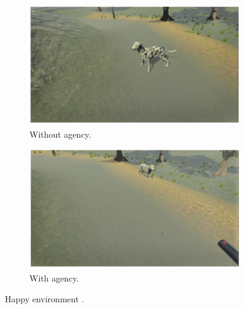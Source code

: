 \begin{figure}[!h] 
    \begin{subfigure}{0.45\textwidth}
    \centering
    \includegraphics[width=\textwidth]{Revisao/Emotion Presence/Scene Happy No.png} 
    \caption{Without agency.} 
    \label{fig:happy_without}
  \end{subfigure}
  \hfill
  \begin{subfigure}{0.45\textwidth}
    \centering
    \includegraphics[width=\textwidth]{Revisao/Emotion Presence/Scene Happy Yes.png}
    \caption{With agency.} 
    \label{fig:happy_with}
  \end{subfigure}
\caption{Happy environment \cite{jicol2021effects}.} 
\label{fig:happy_environment}
\end{figure}

